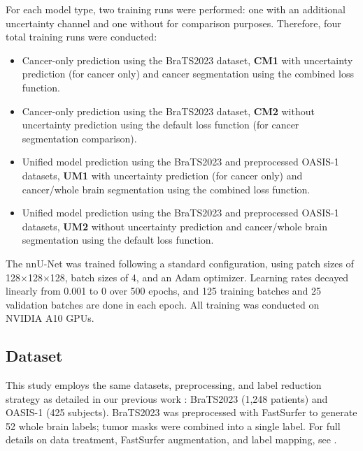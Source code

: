 \documentclass[11pt,letterpaper]{article}
\begin{document}
For each model type, two training runs were performed: one with an additional uncertainty channel and one without for comparison purposes. Therefore, four total training runs were conducted:
\begin{itemize}
    \item Cancer-only prediction using the BraTS2023 dataset, \textbf{CM1} with uncertainty prediction (for cancer only) and cancer segmentation using the combined loss function.
    \item Cancer-only prediction using the BraTS2023 dataset, \textbf{CM2} without uncertainty prediction using the default loss function (for cancer segmentation comparison).
    \item Unified model prediction using the BraTS2023 and preprocessed OASIS-1 datasets, \textbf{UM1} with uncertainty prediction (for cancer only) and cancer/whole brain segmentation using the combined loss function.
    \item Unified model prediction using the BraTS2023 and preprocessed OASIS-1 datasets, \textbf{UM2} without uncertainty prediction and cancer/whole brain segmentation using the default loss function.
\end{itemize}

The nnU-Net was trained following a standard configuration, using patch sizes of 128$\times$128$\times$128, batch sizes of 4, and an Adam optimizer. Learning rates decayed linearly from 0.001 to 0 over 500 epochs, and 125 training batches and 25 validation batches are done in each epoch. All training was conducted on NVIDIA A10 GPUs.

\subsection{Dataset}
This study employs the same datasets, preprocessing, and label reduction strategy as detailed in our previous work \cite{zhou2025unified}: BraTS2023 (1,248 patients) and OASIS-1 (425 subjects). BraTS2023 was preprocessed with FastSurfer to generate 52 whole brain labels; tumor masks were combined into a single label. For full details on data treatment, FastSurfer augmentation, and label mapping, see \cite{zhou2025unified}.
\end{document}
